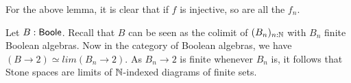 \begin{remark}
  For the above lemma, it is clear that if $f$ is injective, so are all the $f_n$. 
\end{remark}
\begin{remark}
  Let $B:\mathsf{Boole}$. 
  Recall that $B$ can be seen as the colimit of $(B_n)_{n:\mathbb{N}}$ with $B_n$ finite Boolean algebras. 
  Now in the category of Boolean algebras, we have $(B\to 2) \simeq lim(B_n\to 2)$.
  As $B_n\to 2$ is finite whenever $B_n$ is, it follows that Stone spaces are limits of $\mathbb{N}$-indexed diagrams of finite sets. 
\end{remark}


%
%
%
%
